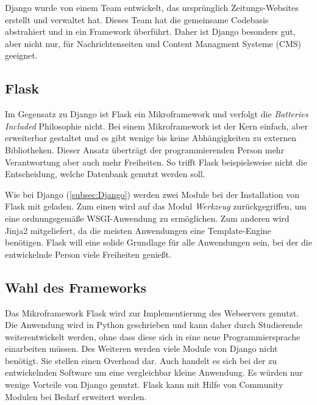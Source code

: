 Django wurde von einem Team entwickelt, das ursprünglich Zeitungs-Websites erstellt und verwaltet hat. Dieses Team hat die gemeinsame Codebasis abstrahiert und in ein Framework überführt. Daher ist Django besonders gut, aber nicht nur, für Nachrichtenseiten und Content Managment Systeme (CMS) geeignet. \cite{mdncontributorsDjangoIntroduction2019}

\subsection{Flask}
Im Gegensatz zu Django ist Flask ein Mikroframework und verfolgt die \textit{Batteries Included} Philosophie nicht. Bei einem Mikroframework ist der Kern einfach, aber erweiterbar gestaltet und es gibt wenige bis keine Abhängigkeiten zu externen Bibliotheken. Dieser Ansatz überträgt der programmierenden Person mehr Verantwortung aber auch mehr Freiheiten. So trifft Flask beispielsweise nicht die Entscheidung, welche Datenbank genutzt werden soll. \cite{palletsForewordFlaskDocumentation2010} 

Wie bei Django (\autoref{subsec:Django}) werden zwei Module bei der Installation von Flask mit geladen. Zum einen wird auf das Modul \textit{Werkzeug} zurückgegriffen, um eine ordnungsgemäße WSGI-Anwendung zu ermöglichen. Zum anderen wird Jinja2 mitgeliefert, da die meisten Anwendungen eine Template-Engine benötigen.
Flask will eine solide Grundlage für alle Anwendungen sein, bei der die entwickelnde Person viele Freiheiten genießt. \cite{palletsDesignDecisionsFlask2010}

\subsection{Wahl des Frameworks}

Das Mikroframework Flask wird zur Implementierung des Webservers genutzt. Die Anwendung wird in Python geschrieben und kann daher durch Studierende weiterentwickelt werden, ohne dass diese sich in eine neue Programmiersprache einarbeiten müssen. Des Weiteren werden viele Module von Django nicht benötigt. Sie stellen einen Overhead dar. Auch handelt es sich bei der zu entwickelnden Software um eine vergleichbar kleine Anwendung. Es würden nur wenige Vorteile von Django genutzt. Flask kann mit Hilfe von Community Modulen bei Bedarf erweitert werden.